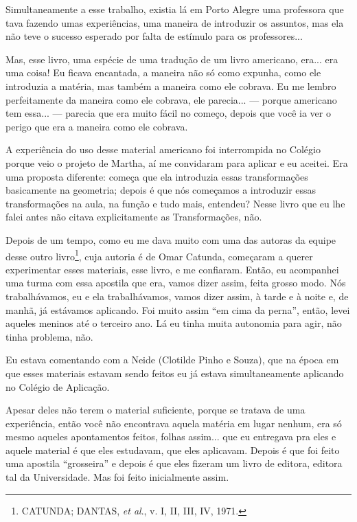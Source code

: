 \documentclass{hipatia}
\begin{document}
Simultaneamente a esse trabalho, existia lá em Porto Alegre uma
professora que tava fazendo umas experiências, uma maneira de introduzir
os assuntos, mas ela não teve o sucesso esperado por falta de estímulo
para os professores...

Mas, esse livro, uma espécie de uma tradução de um livro americano,
era... era uma coisa! Eu ficava encantada, a maneira não só como
expunha, como ele introduzia a matéria, mas também a maneira como ele
cobrava. Eu me lembro perfeitamente da maneira como ele cobrava, ele
parecia... --- porque americano tem essa... --- parecia que era muito
fácil no começo, depois que você ia ver o perigo que era a maneira como
ele cobrava.

A experiência do uso desse material americano foi interrompida no
Colégio porque veio o projeto de Martha, aí me convidaram para aplicar e
eu aceitei. Era uma proposta diferente: começa que ela introduzia essas
transformações basicamente na geometria; depois é que nós começamos a
introduzir essas transformações na aula, na função e tudo mais,
entendeu? Nesse livro que eu lhe falei antes não citava explicitamente
as Transformações, não.

Depois de um tempo, como eu me dava muito com uma das autoras da equipe
desse outro livro\footnote{CATUNDA; DANTAS, \emph{et al}., v. I, II,
  III, IV, 1971.}, cuja autoria é de Omar Catunda, começaram a querer
experimentar esses materiais, esse livro, e me confiaram. Então, eu
acompanhei uma turma com essa apostila que era, vamos dizer assim, feita
grosso modo. Nós trabalhávamos, eu e ela trabalhávamos, vamos dizer
assim, à tarde e à noite e, de manhã, já estávamos aplicando. Foi muito
assim ``em cima da perna'', então, levei aqueles meninos até o terceiro
ano. Lá eu tinha muita autonomia para agir, não tinha problema, não.

Eu estava comentando com a Neide (Clotilde Pinho e Souza), que na época
em que esses materiais estavam sendo feitos eu já estava simultaneamente
aplicando no Colégio de Aplicação.

Apesar deles não terem o material suficiente, porque se tratava de uma
experiência, então você não encontrava aquela matéria em lugar nenhum,
era só mesmo aqueles apontamentos feitos, folhas assim... que eu
entregava pra eles e aquele material é que eles estudavam, que eles
aplicavam. Depois é que foi feito uma apostila ``grosseira'' e depois é
que eles fizeram um livro de editora, editora tal da Universidade. Mas
foi feito inicialmente assim.
\end{document}
